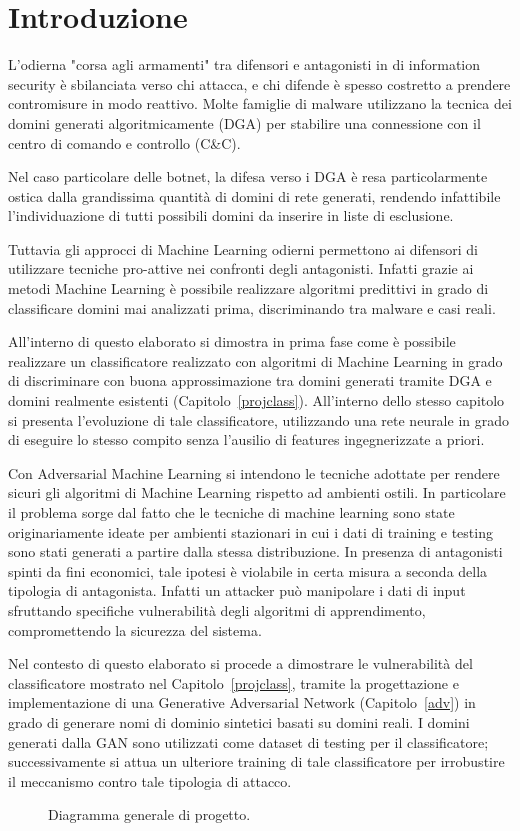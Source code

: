 \chapter{Introduzione}

L'odierna "corsa agli armamenti" tra difensori e antagonisti in di information security è sbilanciata verso chi attacca, e chi difende è spesso costretto a prendere contromisure in modo reattivo. Molte famiglie di malware utilizzano la tecnica dei domini generati algoritmicamente (DGA) per stabilire una connessione con il centro di comando e controllo (C\&C).

Nel caso particolare delle botnet, la difesa verso i DGA è resa particolarmente ostica dalla grandissima quantità di domini di rete generati, rendendo infattibile l'individuazione di tutti possibili domini da inserire in liste di esclusione. 

Tuttavia gli approcci di Machine Learning odierni permettono ai difensori di utilizzare tecniche pro-attive nei confronti degli antagonisti. Infatti grazie ai metodi Machine Learning è possibile realizzare algoritmi predittivi in grado di classificare domini mai analizzati prima, discriminando tra malware e casi reali.

All'interno di questo elaborato si dimostra in prima fase come è possibile realizzare un classificatore realizzato con algoritmi di Machine Learning in grado di discriminare con buona approssimazione tra domini generati tramite DGA e domini realmente esistenti (Capitolo~\ref{projclass}). All'interno dello stesso capitolo si presenta l'evoluzione di tale classificatore, utilizzando una rete neurale in grado di eseguire lo stesso compito senza l'ausilio di features ingegnerizzate a priori.

Con Adversarial Machine Learning si intendono le tecniche adottate per rendere sicuri gli algoritmi di Machine Learning rispetto ad ambienti ostili. In particolare il problema sorge dal fatto che le tecniche di machine learning sono state originariamente ideate per ambienti stazionari in cui i dati di training e testing sono stati generati a partire dalla stessa distribuzione. In presenza di antagonisti spinti da fini economici, tale ipotesi è violabile in certa misura a seconda della tipologia di antagonista. Infatti un attacker può manipolare i dati di input sfruttando specifiche vulnerabilità degli algoritmi di apprendimento, compromettendo la sicurezza del sistema. 

Nel contesto di questo elaborato si procede a dimostrare le vulnerabilità del classificatore mostrato nel Capitolo~\ref{projclass}, tramite la progettazione e implementazione di una Generative Adversarial Network (Capitolo~\ref{adv}) in grado di generare nomi di dominio sintetici basati su domini reali. I domini generati dalla GAN sono utilizzati come dataset di testing per il classificatore; successivamente si attua un ulteriore training di tale classificatore per irrobustire il meccanismo contro tale tipologia di attacco.


\begin{figure}[!bp]
    \centering
	
	\caption{Diagramma generale di progetto. \label{fig:intro}}
\end{figure}
